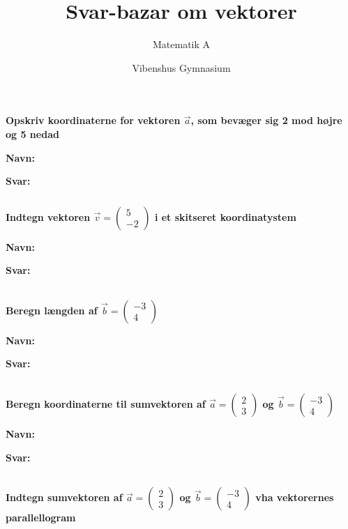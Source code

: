 \documentclass[a4paper, 12pt]{article}
\author{Matematik A}
\date{Vibenshus Gymnasium}
\title{Svar-bazar om vektorer}
\begin{document}
\maketitle
\textbf{Opskriv koordinaterne for vektoren \(\vec{a}\), som bevæger sig 2 mod højre og 5 nedad}


\textbf{Navn:}

\textbf{Svar:}

$\phantom{a}$\\
$\phantom{a}$\\

\textbf{Indtegn vektoren \(\vec{v} = \begin{pmatrix} 5 \\ -2 \end{pmatrix}\) i et skitseret koordinatystem}

\textbf{Navn:}

\textbf{Svar:}

$\phantom{a}$\\
$\phantom{a}$\\
$\phantom{a}$\\

\textbf{Beregn længden af \(\vec{b} = \begin{pmatrix}-3\\4 \end{pmatrix}\)}

\textbf{Navn:}

\textbf{Svar:}

$\phantom{a}$\\
$\phantom{a}$\\
$\phantom{a}$\\

\textbf{Beregn koordinaterne til sumvektoren af \(\vec{a}= \begin{pmatrix} 2\\3 \end{pmatrix}\) og \(\vec{b}=\begin{pmatrix} -3 \\ 4 \end{pmatrix}\)}

\textbf{Navn:}

\textbf{Svar:}

$\phantom{a}$\\
$\phantom{a}$\\
$\phantom{a}$\\

\textbf{Indtegn sumvektoren af \(\vec{a}= \begin{pmatrix} 2\\3 \end{pmatrix}\) og \(\vec{b}=\begin{pmatrix} -3 \\ 4 \end{pmatrix}\) vha vektorernes parallellogram}
\end{document}
